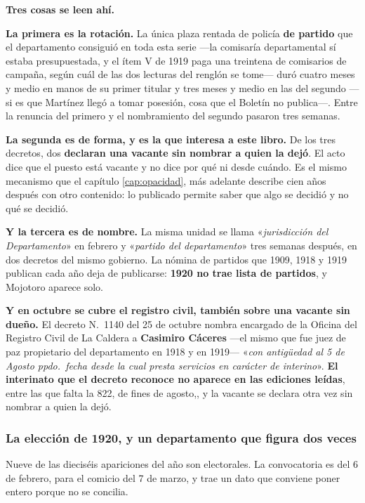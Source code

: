 \begin{cautela}
\textbf{Tres cosas se leen ahí.}

\textbf{La primera es la rotación.} La única plaza rentada de policía \textbf{de partido} que el
departamento consiguió en toda esta serie ---la comisaría departamental sí estaba presupuestada,
y el ítem V de 1919 paga una treintena de comisarios de campaña, según cuál de las dos lecturas del renglón se tome--- duró cuatro meses y medio en manos de su primer titular y tres meses y medio en las del segundo
---si es que Martínez llegó a tomar posesión, cosa que el Boletín no publica---. Entre la renuncia
del primero y el nombramiento del segundo pasaron tres semanas.

\textbf{La segunda es de forma, y es la que interesa a este libro.} De los tres decretos, dos
\textbf{declaran una vacante sin nombrar a quien la dejó}. El acto dice que el puesto está vacante
y no dice por qué ni desde cuándo. Es el mismo mecanismo que el capítulo \ref{cap:opacidad}, más adelante
describe cien años después con otro contenido: lo publicado permite saber que algo se decidió y
no qué se decidió.

\textbf{Y la tercera es de nombre.} La misma unidad se llama «\textit{jurisdicción del
Departamento}» en febrero y «\textit{partido del departamento}» tres semanas después, en dos
decretos del mismo gobierno. La nómina de partidos que 1909, 1918 y 1919 publican cada año deja
de publicarse: \textbf{1920 no trae lista de partidos}, y Mojotoro aparece solo.
\end{cautela}

\textbf{Y en octubre se cubre el registro civil, también sobre una vacante sin dueño.} El decreto
N.\ 1140 del 25 de octubre nombra encargado de la Oficina del Registro Civil de La Caldera a
\textbf{Casimiro Cáceres} ---el mismo que fue juez de paz propietario del departamento en 1918 y
en 1919--- «\textit{con antigüedad al 5 de Agosto ppdo.\ fecha desde la cual presta servicios en
carácter de interino}». \textbf{El interinato que el decreto reconoce no aparece en las ediciones leídas}, entre las que falta la 822, de fines de agosto,, y la
vacante se declara otra vez sin nombrar a quien la dejó.

\subsubsection*{La elección de 1920, y un departamento que figura dos veces}

Nueve de las dieciséis apariciones del año son electorales. La convocatoria es del 6 de febrero,
para el comicio del 7 de marzo, y trae un dato que conviene poner entero porque no se concilia.


